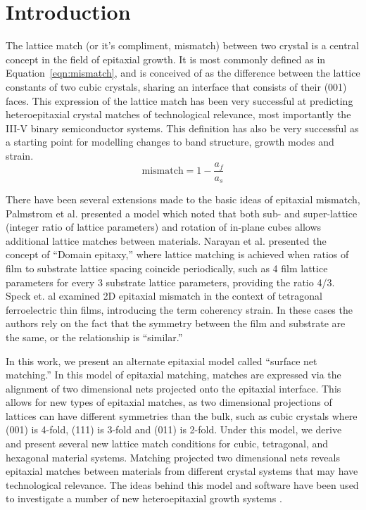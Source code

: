 \documentclass[final,5p,times,twocolumn]{elsarticle}
\begin{document}
\section{Introduction}
\label{Introduction}
The lattice match (or it’s compliment, mismatch) between two crystal is a central concept in the field of epitaxial growth. It is most commonly defined as in Equation~\ref{eqn:mismatch}, and is conceived of as the difference between the lattice constants of two cubic crystals, sharing an interface that consists of their (001) faces. This expression of the lattice match has been very successful at predicting heteroepitaxial crystal matches of technological relevance, most importantly the III-V binary semiconductor systems. This definition has also be very successful as a starting point for modelling changes to band structure\cite{Chuang1991}, growth modes\cite{Dunstan1997} and strain\cite{Dunstan1997}.
\begin{equation}
\text{mismatch} = 1 - \frac{a_f}{a_s} \label{eqn:mismatch}
\end{equation}

There have been several extensions made to the basic ideas of epitaxial mismatch, Palmstrom et al. \cite{Palmstrom1995} presented a model which noted that both sub- and super-lattice (integer ratio of lattice parameters) and rotation of in-plane cubes allows additional lattice matches between materials. Narayan et al. \cite{Narayan2003} presented the concept of ``Domain epitaxy,'' where lattice matching is achieved when ratios of film to substrate lattice spacing coincide periodically, such as 4 film lattice parameters for every 3 substrate lattice parameters, providing the ratio 4/3. Speck et. al examined 2D epitaxial mismatch in the context of tetragonal ferroelectric thin films, introducing the term coherency strain\cite{Speck1995,Speck1994,Speck1994a}. In these cases the authors rely on the fact that the symmetry between the film and substrate are the same, or the relationship is “similar.”

In this work, we present an alternate epitaxial model called ``surface net matching.'' In this model of epitaxial matching, matches are expressed via the alignment of two dimensional nets projected onto the epitaxial interface. This allows for new types of epitaxial matches, as two dimensional projections of lattices can have different symmetries than the bulk, such as cubic crystals where (001) is 4-fold, (111) is 3-fold and (011) is 2-fold. Under this model, we derive and present several new lattice match conditions for cubic, tetragonal, and hexagonal material systems. Matching projected two dimensional nets reveals epitaxial matches between materials from different crystal systems that may have technological relevance. The ideas behind this model and software have been used to investigate a number of new heteroepitaxial growth systems \cite{Devenyi2009,Neretina2006,Neretina2008b}.
\end{document}
